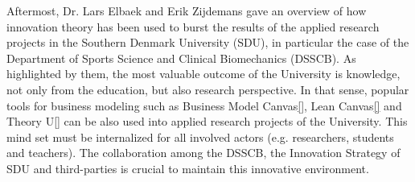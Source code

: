 Aftermost, Dr. Lars Elbaek and Erik Zijdemans gave an overview of how innovation theory has been used to burst the results of the applied research projects in the Southern Denmark University (SDU), in particular the case of the Department of Sports Science and Clinical Biomechanics (DSSCB). 
As highlighted by them, the most valuable outcome of the University is knowledge, not only from the education, but also research perspective.
In that sense, popular tools for business modeling such as Business Model Canvas\ref{}, Lean Canvas\ref{} and Theory U\ref{} can be also used into applied research projects of the University.
This mind set must be internalized for all involved actors (e.g. researchers, students and teachers). 
The collaboration among the DSSCB, the Innovation Strategy of SDU and third-parties is crucial to maintain this innovative environment.





